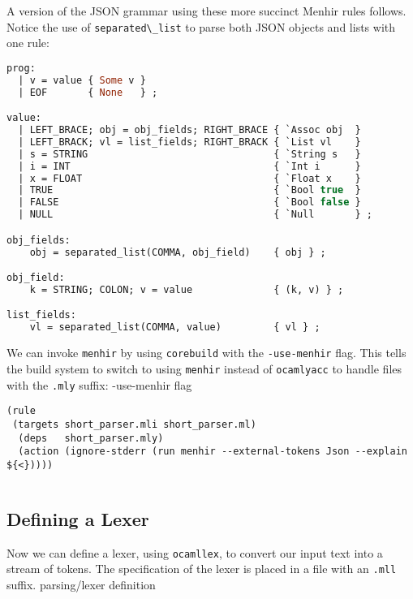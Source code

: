 A version of the JSON grammar using these more succinct Menhir rules
follows. Notice the use of \passthrough{\lstinline!separated\_list!} to
parse both JSON objects and lists with one rule:

\begin{lstlisting}[language=Caml]
prog:
  | v = value { Some v }
  | EOF       { None   } ;

value:
  | LEFT_BRACE; obj = obj_fields; RIGHT_BRACE { `Assoc obj  }
  | LEFT_BRACK; vl = list_fields; RIGHT_BRACK { `List vl    }
  | s = STRING                                { `String s   }
  | i = INT                                   { `Int i      }
  | x = FLOAT                                 { `Float x    }
  | TRUE                                      { `Bool true  }
  | FALSE                                     { `Bool false }
  | NULL                                      { `Null       } ;

obj_fields:
    obj = separated_list(COMMA, obj_field)    { obj } ;

obj_field:
    k = STRING; COLON; v = value              { (k, v) } ;

list_fields:
    vl = separated_list(COMMA, value)         { vl } ;
\end{lstlisting}

We can invoke \passthrough{\lstinline!menhir!} by using
\passthrough{\lstinline!corebuild!} with the
\passthrough{\lstinline!-use-menhir!} flag. This tells the build system
to switch to using \passthrough{\lstinline!menhir!} instead of
\passthrough{\lstinline!ocamlyacc!} to handle files with the
\passthrough{\lstinline!.mly!} suffix: {-use-menhir
flag}~

\begin{lstlisting}
(rule
 (targets short_parser.mli short_parser.ml)
  (deps   short_parser.mly)
  (action (ignore-stderr (run menhir --external-tokens Json --explain ${<}))))
\end{lstlisting}

\begin{lstlisting}[language=bash]
\end{lstlisting}

\hypertarget{defining-a-lexer}{%
\subsection{Defining a Lexer}\label{defining-a-lexer}}

Now we can define a lexer, using \passthrough{\lstinline!ocamllex!}, to
convert our input text into a stream of tokens. The specification of the
lexer is placed in a file with an \passthrough{\lstinline!.mll!} suffix.
\protect\hypertarget{PARlex}{}{parsing/lexer definition}

